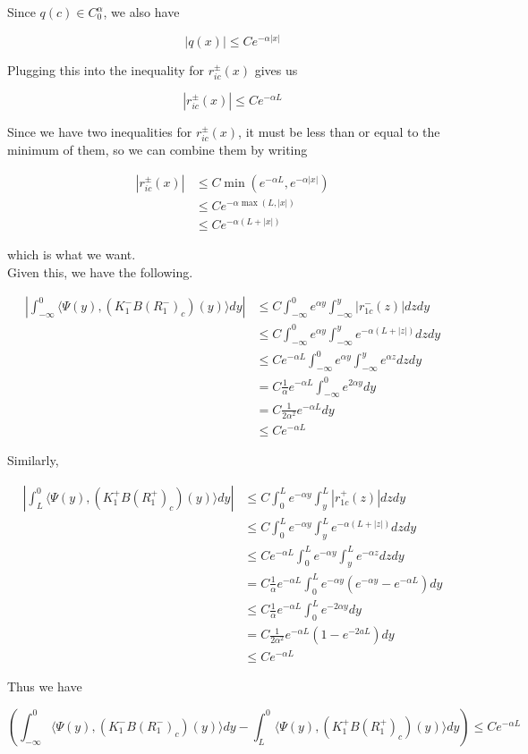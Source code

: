 \documentclass[12pt]{article}
\begin{document}
\begin{enumerate}
Since $q(c) \in C_0^\alpha$, we also have

\[ 
|q(x)| \leq C e^{-\alpha |x|}
\]

Plugging this into the inequality for $r_{ic}^\pm(x)$ gives us

\[
|r_{ic}^\pm(x)| \leq C e^{-\alpha L}
\]

Since we have two inequalities for $r_{ic}^\pm(x)$, it must be less than or equal to the minimum of them, so we can combine them by writing

\begin{align*}
|r_{ic}^\pm(x)| &\leq C \min( e^{-\alpha L}, e^{-\alpha |x|} ) \\
&\leq C e^{-\alpha \max(L, |x|)} \\
&\leq C e^{{-\alpha (L + |x|)}}
\end{align*}

which is what we want.\\

Given this, we have the following.

\begin{align*}
\left| \int_{-\infty}^0 \langle \Psi(y), (K_1^- B (R_1^-)_c)(y) \rangle dy \right| &\leq C \int_{-\infty}^0 e^{\alpha y} \int_{-\infty}^y |r_{1c}^-(z)| dz dy \\
&\leq C \int_{-\infty}^0 e^{\alpha y} \int_{-\infty}^y e^{-\alpha(L + |z|)} dz dy \\
&\leq C e^{-\alpha L} \int_{-\infty}^0 e^{\alpha y} \int_{-\infty}^y e^{\alpha z} dz dy \\
&= C \frac{1}{\alpha} e^{-\alpha L} \int_{-\infty}^0 e^{2 \alpha y} dy \\
&= C \frac{1}{2 \alpha^2 } e^{-\alpha L} dy \\
&\leq C e^{-\alpha L}
\end{align*}

Similarly,

\begin{align*}
\left| \int_{L}^0 \langle \Psi(y), (K_1^+ B (R_1^+)_c)(y) \rangle dy\right| &\leq C \int_0^L e^{-\alpha y} \int_y^L |r_{1c}^+(z)| dz dy \\
&\leq C \int_0^L e^{-\alpha y} \int_y^L e^{-\alpha(L + |z|)} dz dy \\
&\leq C e^{-\alpha L} \int_0^L e^{-\alpha y} \int_y^L e^{-\alpha z} dz dy \\
&= C \frac{1}{\alpha} e^{-\alpha L} \int_0^L e^{-\alpha y} (e^{-\alpha y} - e^{-\alpha L}) dy \\
&\leq C \frac{1}{\alpha} e^{-\alpha L} \int_0^L e^{-2\alpha y} dy \\
&= C \frac{1}{2 \alpha^2 } e^{-\alpha L} (1 - e^{-2aL})dy \\
&\leq C e^{-\alpha L}
\end{align*}

Thus we have

\[
\left( \int_{-\infty}^0 \langle \Psi(y), (K_1^- B (R_1^-)_c)(y) \rangle dy - \int_{L}^0 \langle \Psi(y), (K_1^+ B (R_1^+)_c)(y) \rangle dy \right) \leq C e^{-\alpha L}
\]

\end{enumerate}
\end{document}
